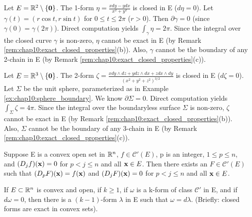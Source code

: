 \begin{example}
  \label{ex:chap10:closed_not_exact_1form}
  Let $E = \mathbb{R}^2 \setminus \{ \mathbf{0} \}$. The 1-form $\eta = \frac{x
  dy - y dx}{x^2 + y^2}$ is closed in E ($d\eta = 0$). Let $\gamma(t)
  = (r \cos t, r \sin t)$ for $0 \le t \le 2\pi$ ($r>0$). Then
  $\partial \gamma = 0$ (since $\gamma(0)=\gamma(2\pi)$). Direct
  computation yields $\int_\gamma \eta = 2\pi$. Since the integral
  over the closed curve $\gamma$ is non-zero, $\eta$ cannot be exact
  in E (by Remark \ref{rem:chap10:exact_closed_properties}(b)). Also,
  $\gamma$ cannot be the boundary of any 2-chain in E (by Remark
  \ref{rem:chap10:exact_closed_properties}(c)).
\end{example}

\begin{example}
  \label{ex:chap10:closed_not_exact_2form}
  Let $E = \mathbb{R}^3 \setminus \{ \mathbf{0} \}$. The 2-form $\zeta =
  \frac{x dy \wedge dz + y dz \wedge dx + z dx \wedge dy}{(x^2 + y^2
  + z^2)^{3/2}}$ is closed in E ($d\zeta = 0$). Let $\Sigma$ be the
  unit sphere, parameterized as in Example
  \ref{ex:chap10:sphere_boundary}. We know $\partial \Sigma = 0$.
  Direct computation yields $\int_\Sigma \zeta = 4\pi$. Since the
  integral over the boundaryless surface $\Sigma$ is non-zero,
  $\zeta$ cannot be exact in E (by Remark
  \ref{rem:chap10:exact_closed_properties}(b)). Also, $\Sigma$ cannot
  be the boundary of any 3-chain in E (by Remark
  \ref{rem:chap10:exact_closed_properties}(c)).
\end{example}

\begin{theorem}
  \label{thm:chap10:poincare_helper_lemma}
  Suppose E is a convex open set in $\mathbb{R}^n$, $f \in \mathcal{C}'(E)$,
  p is an integer, $1 \le p \le n$, and $(D_j f)(\mathbf{x}) = 0$ for
  $p < j \le n$ and all $\mathbf{x} \in E$.
  Then there exists an $F \in \mathcal{C}'(E)$ such that $(D_p
  F)(\mathbf{x}) = f(\mathbf{x})$ and $(D_j F)(\mathbf{x}) = 0$ for $p < j
  \le n$ and all $\mathbf{x} \in E$.
\end{theorem}



\begin{theorem}
  \label{thm:chap10:poincare_lemma}
  If $E \subset \mathbb{R}^n$ is convex and open, if $k \ge 1$, if $\omega$
  is a k-form of class $\mathcal{C}'$ in E, and if $d\omega = 0$,
  then there is a $(k-1)$-form $\lambda$ in E such that $\omega = d\lambda$.
  (Briefly: closed forms are exact in convex sets).
\end{theorem}

